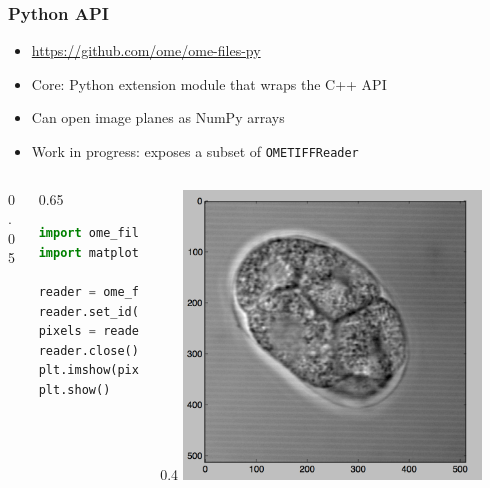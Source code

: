 \documentclass{beamer}
\begin{document}
\begin{frame}[fragile]
  \frametitle{Python API}

  \begin{itemize}
  \item \url{https://github.com/ome/ome-files-py}
  \item Core: Python extension module that wraps the C++ API
  \item Can open image planes as NumPy arrays
  \item Work in progress: exposes a subset of \texttt{OMETIFFReader}
  \end{itemize}
  \begin{columns}
    \begin{column}{0.05\textwidth}
    \end{column}
    \begin{column}{0.65\textwidth}
      \centering
      \begin{lstlisting}[language=Python]
import ome_files
import matplotlib.pyplot as plt

reader = ome_files.OMETIFFReader()
reader.set_id("tubhiswt_C0.ome.tif")
pixels = reader.open_array(0)
reader.close()
plt.imshow(pixels, cmap="gray")
plt.show()
      \end{lstlisting}
    \end{column}
    \begin{column}{0.4\textwidth}
      \centering
      \includegraphics[width=0.85\textwidth]{cpp-dundee-2017-figures/openbytes.png}
    \end{column}
  \end{columns}
\end{frame}
\end{document}
